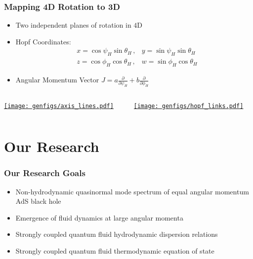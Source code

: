 \documentclass[xcolor=dvipsnames]{beamer}
\begin{document}

\begin{frame}[squeeze]
  \frametitle{Mapping 4D Rotation to 3D}
  \begin{itemize}
    \item Two independent planes of rotation in $4$D 
    \item Hopf Coordinates: 
      \begin{align*}
        &x=\cos\psi_H\sin \theta_H\,,&y=\sin \psi_H\sin \theta_H\\
        &z=\cos \phi_H\cos \theta_H\,,&w=\sin \phi_H\cos \theta_H
      \end{align*}
    \item Angular Momentum Vector $J = a\frac\partial{\partial\psi_H} + b\frac\partial{\partial\phi_H}$
  \end{itemize}
  \begin{columns}[t]
    \begin{column}{0.5\paperwidth}
      \href{https://markuspad.com/figures/axis_lines.html}{\texttt{[image: genfigs/axis\_lines.pdf]}}
    \end{column}
    \begin{column}{0.5\paperwidth}
      \href{https://markuspad.com/figures/hopf_links.html}{\texttt{[image: genfigs/hopf\_links.pdf]}}
    \end{column}
  \end{columns}
\end{frame}

\section{Our Research}


\begin{frame}
  \frametitle{Our Research Goals}

  \begin{itemize}
    \item Non-hydrodynamic quasinormal mode spectrum of equal angular momentum AdS black hole
    \item Emergence of fluid dynamics at large angular momenta
    \item Strongly coupled quantum fluid hydrodynamic dispersion relations
    \item Strongly coupled quantum fluid thermodynamic equation of state
  \end{itemize}

\end{frame}
\end{document}
